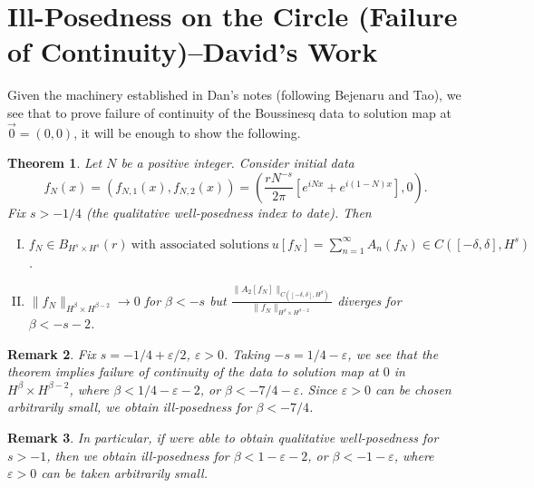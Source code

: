 \documentclass{amsart}
\newtheorem{theorem}{Theorem}[section]
\newtheorem{remark}[theorem]{Remark}
\newcommand{\ee}{\varepsilon}
\begin{document}
\section{Ill-Posedness on the Circle (Failure of Continuity)--David's Work} 
\label{sec:pf-ill-pos}
Given the machinery established in Dan's notes (following Bejenaru and Tao), we see that to prove failure of continuity of the Boussinesq data to solution map at $\vec{0} =
(0, 0)$, it will be enough to show the
following.
%
%
%
%
%
%
%
%
%
%
%
\begin{theorem}
  Let $N$ be a positive integer. Consider initial data $$f_{N}(x) =
  (f_{N,1}(x), f_{N,2}(x)) = \left ( \frac{r N^{-s}}{2 \pi}\left[ e^{iNx} + e^{i(1-N)x} \right], 0
  \right ).$$  Fix $ s > -1/4$ (the qualitative well-posedness index to date). Then
    \begin{enumerate}[(I)]
      \item{$ f_{N} \in B_{H^{s} \times H^{s}}(r) \ \text{with associated
    solutions}
    \ u[f_{N}] = \sum_{n=1}^{\infty} A_{n}(f_{N}) \in C([-\delta, \delta],
    H^{s})$}.
    \\
  \item
    $\|f_{N}\|_{H^{\beta} \times H^{\beta-2}} \to 0$ for $\beta < -s$ but 
    $ \displaystyle \frac{\|A_{2}[f_{N}]\|_{C( [-\delta, \delta], H^{\beta})}}{\| f_{N} \|_{H^{\beta} \times H^{\beta -2}}}$ diverges for \\ $\beta < -s -2$.
\end{enumerate}
\label{thm:ill-pos}
\end{theorem}
%
%
\begin{framed}
  \begin{remark}
    Fix $s = -1/4 + \ee/2$, $\ee > 0$. Taking $-s = 1/4 - \ee$, we see that the theorem implies failure of continuity of the data to solution map at $0$ in $H^{\beta} \times H^{\beta -2}$, where $\beta < 1/4 - \ee -2$, or $\beta < -7/4 - \ee$. Since $\ee > 0$ can be chosen arbitrarily small, we obtain ill-posedness for $\beta < -7/4$. 
  \end{remark}
\end{framed}
%
%
\begin{framed}
  \begin{remark}
    In particular, if were able to obtain qualitative well-posedness for $s > -1$, then we obtain ill-posedness for $\beta < 1 - \ee -2$, or $ \beta < -1 - \ee$, where $\ee > 0$ can be taken arbitrarily small. 
  \end{remark}
\end{framed}
\end{document}

